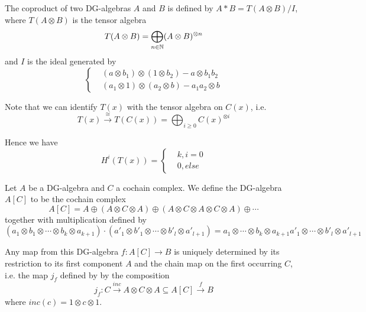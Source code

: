 The coproduct of two DG-algebras $A$ and $B$ is defined by $A\ast B = T(A\otimes B)/I$, where $T(A\otimes B)$ is the tensor algebra
\begin{equation*}
    T(A\otimes B) = \bigoplus_{n \in \mathbb{N}}(A\otimes B)^{\otimes n}
\end{equation*}
and $I$ is the ideal generated by 
\begin{equation*}
    \begin{cases}
        & (a\otimes b_1)\otimes (1\otimes b_2) - a\otimes b_1 b_2    \\
        & (a_1\otimes 1)\otimes (a_2 \otimes b) - a_1 a_2 \otimes b
    \end{cases}
\end{equation*}

Note that we can identify $T(x)$ with the tensor algebra on $C(x)$, i.e. 
\begin{equation*}
    T(x) \overset{\cong}\longrightarrow T(C(x)) = \bigoplus_{i\geq 0}C(x)^{\otimes i}
\end{equation*}

Hence we have 
\begin{equation*}
H^i(T(x)) = 
\begin{cases}
    &k, i=0 \\
    &0, else
\end{cases}
\end{equation*}

\begin{definition}
Let $A$ be a DG-algebra and $C$ a cochain complex. We define the DG-algebra $A[C]$ to be the cochain complex
\begin{equation*}
    A[C] = A\oplus (A\otimes C\otimes A) \oplus (A\otimes C \otimes A \otimes C \otimes A) \oplus \cdots
\end{equation*}
together with multiplication defined by 
\begin{equation*}
    (a_1\otimes b_1 \otimes \cdots \otimes b_k \otimes a_{k+1}) \cdot (a'_1\otimes b'_1 \otimes \cdots \otimes b'_l \otimes a'_{l+1}) = a_1 \otimes \cdots \otimes b_k \otimes a_{k+1}a'_1 \otimes \cdots \otimes b'_l \otimes a'_{l+1}
\end{equation*}
\end{definition}

Any map from this DG-algebra $f:A[C]\longrightarrow B$ is uniquely determined by its restriction to its first component $A$ and the chain map on the first occurring $C$, i.e. the map $j_f$ defined by by the composition
\begin{equation*}
    j_f: C\overset{inc}\longrightarrow A\otimes C\otimes A \subseteq A[C]\overset{f}\longrightarrow B
\end{equation*}
where $inc(c) = 1\otimes c \otimes 1$. 

